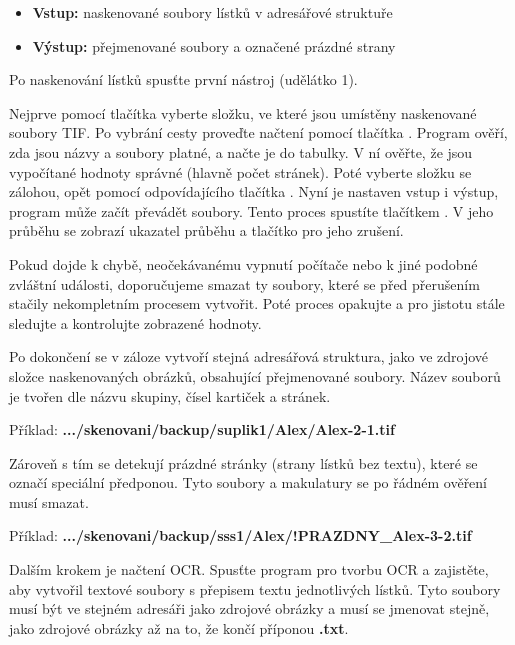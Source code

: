 \begin{itemize}
\item{{\bf Vstup:} naskenované soubory lístků v adresářové struktuře}
\item{{\bf Výstup:} přejmenované soubory a označené prázdné strany}
\end{itemize}

Po naskenování lístků spusťte první nástroj (udělátko 1).

Nejprve pomocí tlačítka  vyberte složku, ve které jsou umístěny naskenované soubory TIF. Po vybrání cesty proveďte načtení pomocí tlačítka . Program ověří, zda jsou názvy a soubory platné, a načte je do tabulky. V ní ověřte, že jsou vypočítané hodnoty správné (hlavně počet stránek). Poté vyberte složku se zálohou, opět pomocí odpovídajícího tlačítka . Nyní je nastaven vstup i výstup, program může začít převádět soubory. Tento proces spustíte tlačítkem . V jeho průběhu se zobrazí ukazatel průběhu a tlačítko pro jeho zrušení. 

{\color{OliveGreen} Pokud dojde k chybě, neočekávanému vypnutí počítače nebo k jiné podobné zvláštní události, doporučujeme smazat ty soubory, které se před přerušením stačily nekompletním procesem vytvořit. Poté proces opakujte a pro jistotu stále sledujte a kontrolujte zobrazené hodnoty.}

Po dokončení se v záloze vytvoří stejná adresářová struktura, jako ve zdrojové složce naskenovaných obrázků, obsahující přejmenované soubory. Název souborů je tvořen dle názvu skupiny, čísel kartiček a stránek. 

Příklad: {\bf .../skenovani/backup/suplik1/Alex/Alex-2-1.tif}

Zároveň s tím se detekují prázdné stránky (strany lístků bez textu), které se označí speciální předponou. Tyto soubory a makulatury se po řádném ověření musí smazat.

Příklad: {\bf .../skenovani/backup/sss1/Alex/!PRAZDNY\_Alex-3-2.tif}

Dalším krokem je načtení OCR. Spusťte program pro tvorbu OCR a zajistěte, aby vytvořil textové soubory s přepisem textu jednotlivých lístků. Tyto soubory musí být ve stejném adresáři jako zdrojové obrázky a musí se jmenovat stejně, jako zdrojové obrázky až na to, že končí příponou {\bf .txt}.

